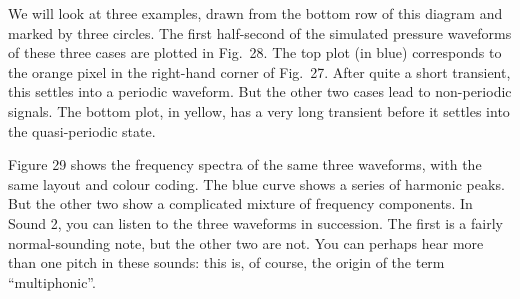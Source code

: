 
  We will look at three examples, drawn from the bottom row of this diagram and 
  marked by three circles. The first half-second of the simulated pressure 
  waveforms of these three cases are plotted in Fig.\ 28. The top plot (in 
  blue) corresponds to the orange pixel in the right-hand corner of Fig.\ 27. 
  After quite a short transient, this settles into a periodic waveform. But the 
  other two cases lead to non-periodic signals. The bottom plot, in yellow, has 
  a very long transient before it settles into the quasi-periodic state. 


  Figure 29 shows the frequency spectra of the same three waveforms, with the 
  same layout and colour coding. The blue curve shows a series of harmonic 
  peaks. But the other two show a complicated mixture of frequency components. 
  In Sound 2, you can listen to the three waveforms in succession. The first is 
  a fairly normal-sounding note, but the other two are not. You can perhaps 
  hear more than one pitch in these sounds: this is, of course, the origin of 
  the term “multiphonic”. 



